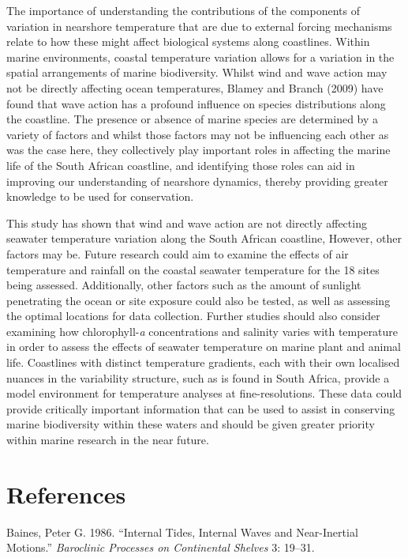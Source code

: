 \documentclass[10pt,a4paper,]{article}
\begin{document}
The importance of understanding the contributions of the components of
variation in nearshore temperature that are due to external forcing
mechanisms relate to how these might affect biological systems along
coastlines. Within marine environments, coastal temperature variation
allows for a variation in the spatial arrangements of marine
biodiversity. Whilst wind and wave action may not be directly affecting
ocean temperatures, Blamey and Branch (2009) have found that wave action
has a profound influence on species distributions along the coastline.
The presence or absence of marine species are determined by a variety of
factors and whilst those factors may not be influencing each other as
was the case here, they collectively play important roles in affecting
the marine life of the South African coastline, and identifying those
roles can aid in improving our understanding of nearshore dynamics,
thereby providing greater knowledge to be used for conservation.

This study has shown that wind and wave action are not directly
affecting seawater temperature variation along the South African
coastline, However, other factors may be. Future research could aim to
examine the effects of air temperature and rainfall on the coastal
seawater temperature for the 18 sites being assessed. Additionally,
other factors such as the amount of sunlight penetrating the ocean or
site exposure could also be tested, as well as assessing the optimal
locations for data collection. Further studies should also consider
examining how chlorophyll-\emph{a} concentrations and salinity varies
with temperature in order to assess the effects of seawater temperature
on marine plant and animal life. Coastlines with distinct temperature
gradients, each with their own localised nuances in the variability
structure, such as is found in South Africa, provide a model environment
for temperature analyses at fine-resolutions. These data could provide
critically important information that can be used to assist in
conserving marine biodiversity within these waters and should be given
greater priority within marine research in the near future.

\newpage

\hypertarget{references}{%
\section*{References}\label{references}}

\hypertarget{refs}{}
\leavevmode\hypertarget{ref-Baines1986}{}%
Baines, Peter G. 1986. ``Internal Tides, Internal Waves and
Near-Inertial Motions.'' \emph{Baroclinic Processes on Continental
Shelves} 3: 19--31.
\end{document}
